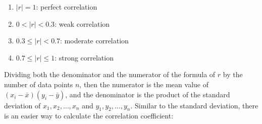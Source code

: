 \documentclass{report}
\begin{document}
\begin{multicols}{2}
  \begin{enumerate}
    \item $|r| = 1$: perfect correlation
    \item $0 < |r| < 0.3$: weak correlation
    \item $0.3 \leq |r| < 0.7$: moderate correlation
    \item $0.7 \leq |r| \leq 1$: strong correlation
  \end{enumerate}

  Dividing both the denominator and the numerator of the formula of $r$ by the
  number of data points $n$, then the numerator is the mean value of $(x_i -
    \bar{x})(y_i - \bar{y})$, and the denominator is the product of the standard
  deviation of $x_1, x_2, \dots, x_n$ and $y_1, y_2, \dots, y_n$. Similar to the
  standard deviation, there is an easier way to calculate the correlation
  coefficient:


\end{multicols}
\end{document}
